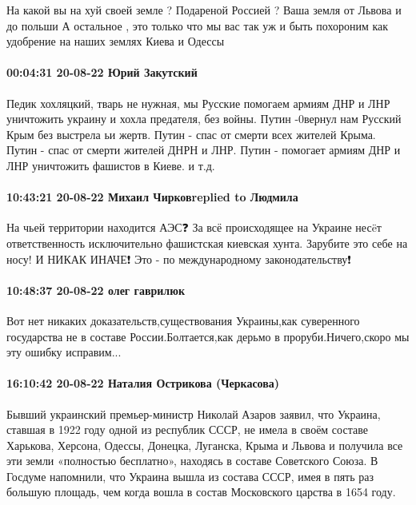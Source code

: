 На какой вы на хуй своей земле ?
Подареной Россией ?
Ваша земля от Львова и до польши
А остальное , это только что мы вас так уж и быть похороним как удобрение на
наших землях Киева и Одессы

\paragraph{00:04:31 20-08-22 Юрий Закутский}

Педик хохляцкий, тварь не нужная, мы Русские помогаем армиям ДНР и ЛНР
уничтожить украину и хохла предателя, без войны. Путин -0вернул нам Русский
Крым без выстрела ьи жертв. Путин - спас от смерти всех жителей Крыма. Путин -
спас от смерти жителей ДНРН и ЛНР. Путин - помогает армиям ДНР и ЛНР уничтожить
фашистов в Киеве. и т.д.

\paragraph{10:43:21 20-08-22 Михаил Чирковreplied to Людмила}

На чьей территории находится АЭС❓
За всё происходящее на Украине несëт ответственность исключительно фашистская киевская хунта. Зарубите это себе на носу! И НИКАК ИНАЧЕ❗️
Это - по международному законодательству❗

\paragraph{10:48:37 20-08-22 олег гаврилюк}

Вот нет никаких доказательств,существования Украины,как суверенного государства
не в составе России.Болтается,как дерьмо в проруби.Ничего,скоро мы эту ошибку
исправим...

\paragraph{16:10:42 20-08-22 Наталия Острикова (Черкасова)}

Бывший украинский премьер-министр Николай Азаров заявил, что Украина, ставшая в
1922 году одной из республик СССР, не имела в своём составе Харькова, Херсона,
Одессы, Донецка, Луганска, Крыма и Львова и получила все эти земли «полностью
бесплатно», находясь в составе Советского Союза. В Госдуме напомнили, что
Украина вышла из состава СССР, имея в пять раз большую площадь, чем когда вошла
в состав Московского царства в 1654 году.

